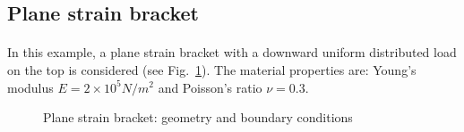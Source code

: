 \subsection{Plane strain bracket}
\paragraph{}
In this example, a plane strain bracket with a downward uniform distributed load on the top is considered (see Fig.~\ref{qdt_fig:ex_bracket_geo_bc}).
The material properties are: Young’s modulus $E = 2\times 10^5 N/m^2$ and Poisson’s ratio $\nu = 0.3$.
    \begin{figure}[H]
        \centering
        \begin{subfigure}[b]{1\linewidth}
            \centering
        \end{subfigure}
        \begin{subfigure}[b]{1\linewidth}
            \centering
        \end{subfigure}
        \caption{ Plane strain bracket: geometry and boundary conditions}
        \label{qdt_fig:ex_bracket_geo_bc}
    \end{figure}


